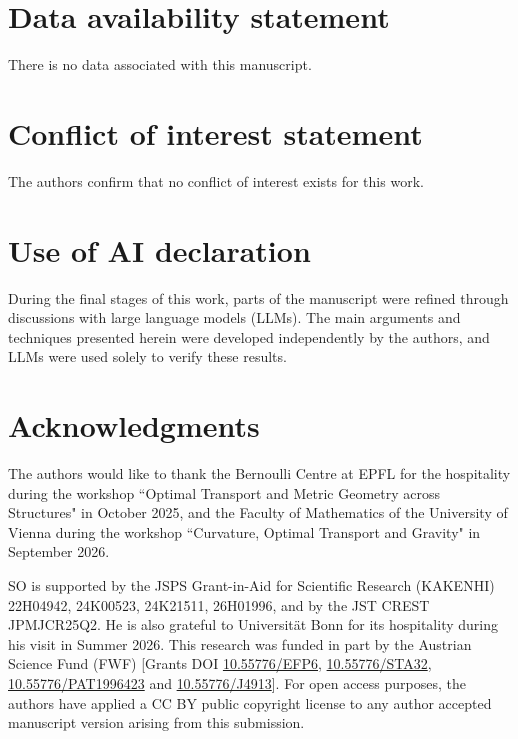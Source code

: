 \documentclass[a4paper,11pt]{article}
\numberwithin{equation}{section}
\theoremstyle{definition}
\theoremstyle{plain}
\begin{document}
\section*{Data availability statement}

There is no data associated with this manuscript.

\section*{Conflict of interest statement}

The authors confirm that no conflict of interest exists for this work.

\section*{Use of AI declaration}

During the final stages of this work, parts of the manuscript were refined through discussions with large language models (LLMs).
The main arguments and techniques presented herein were developed independently by the authors, and LLMs were used solely to verify these results.

\section*{Acknowledgments}

The authors would like to thank the Bernoulli Centre at EPFL for the hospitality during the workshop ``Optimal Transport and Metric Geometry across Structures" in October 2025, and the Faculty of Mathematics of the University of Vienna during the workshop ``Curvature, Optimal Transport and Gravity" in September 2026.

SO is supported by the JSPS Grant-in-Aid for Scientific Research (KAKENHI) 22H04942, 24K00523, 24K21511, 26H01996, and by the JST CREST JPMJCR25Q2. He is also grateful to Universit\"at Bonn for its hospitality during his visit in Summer 2026.
This research was funded in part by the Austrian Science Fund (FWF) [Grants DOI \href{https://doi.org/10.55776/EFP6}{10.55776/EFP6}, \href{https://doi.org/10.55776/STA32}{10.55776/STA32}, \href{https://doi.org/10.55776/PAT1996423}{10.55776/PAT1996423} and \href{https://doi.org/10.55776/J4913}{10.55776/J4913}]. For open access purposes, the authors have applied a CC BY public copyright license to any author accepted manuscript version arising from this submission.

\printbibliography
\end{document}
